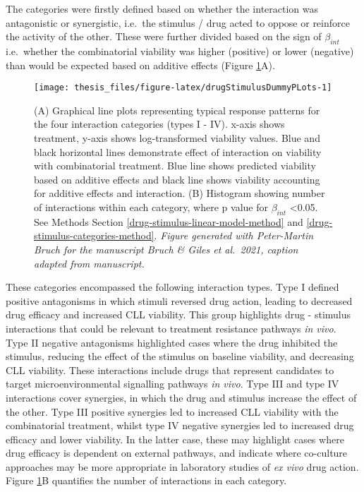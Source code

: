 \documentclass[11pt, a4paper, twosided]{book}
\begin{document}
The categories were firstly defined based on whether the interaction was antagonistic or synergistic, i.e.~the stimulus / drug acted to oppose or reinforce the activity of the other. These were further divided based on the sign of \(\beta_{int}\) i.e.~whether the combinatorial viability was higher (positive) or lower (negative) than would be expected based on additive effects (Figure \ref{fig:drugStimulusDummyPLots}A).


\begin{figure}

{\centering \texttt{[image: thesis\_files/figure-latex/drugStimulusDummyPLots-1]} 

}

\caption{(A) Graphical line plots representing typical response patterns for the four interaction categories (types I - IV). x-axis shows treatment, y-axis shows log-transformed viability values. Blue and black horizontal lines demonstrate effect of interaction on viability with combinatorial treatment. Blue line shows predicted viability based on additive effects and black line shows viability accounting for additive effects and interaction. (B) Histogram showing number of interactions within each category, where p value for \(\beta_{int}\) \textless0.05. See Methods Section \ref{drug-stimulus-linear-model-method} and \ref{drug-stimulus-categories-method}. \emph{Figure generated with Peter-Martin Bruch for the manuscript Bruch \& Giles et al.~2021, caption adapted from manuscript.}}\label{fig:drugStimulusDummyPLots}
\end{figure}
These categories encompassed the following interaction types. Type I defined positive antagonisms in which stimuli reversed drug action, leading to decreased drug efficacy and increased CLL viability. This group highlights drug - stimulus interactions that could be relevant to treatment resistance pathways \emph{in vivo}. Type II negative antagonisms highlighted cases where the drug inhibited the stimulus, reducing the effect of the stimulus on baseline viability, and decreasing CLL viability. These interactions include drugs that represent candidates to target microenvironmental signalling pathways \emph{in vivo}. Type III and type IV interactions cover synergies, in which the drug and stimulus increase the effect of the other. Type III positive synergies led to increased CLL viability with the combinatorial treatment, whilst type IV negative synergies led to increased drug efficacy and lower viability. In the latter case, these may highlight cases where drug efficacy is dependent on external pathways, and indicate where co-culture approaches may be more appropriate in laboratory studies of \emph{ex vivo} drug action. Figure \ref{fig:drugStimulusDummyPLots}B quantifies the number of interactions in each category.
\end{document}

